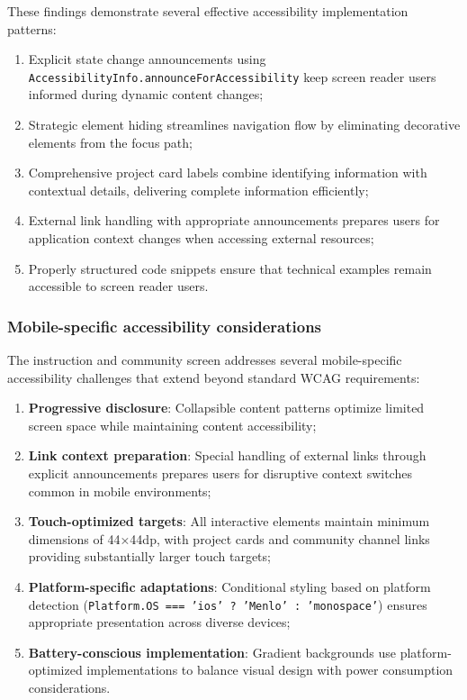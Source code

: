 These findings demonstrate several effective accessibility implementation patterns:
\begin{enumerate}
    \item Explicit state change announcements using \texttt{AccessibilityInfo.announceForAccessibility} keep screen reader users informed during dynamic content changes;
    
    \item Strategic element hiding streamlines navigation flow by eliminating decorative elements from the focus path;
    
    \item Comprehensive project card labels combine identifying information with contextual details, delivering complete information efficiently;
    
    \item External link handling with appropriate announcements prepares users for application context changes when accessing external resources;
    
    \item Properly structured code snippets ensure that technical examples remain accessible to screen reader users.
\end{enumerate}

\subsubsection{Mobile-specific accessibility considerations}
\label{subsubsec:instruction-mobile-specific-summary}

The instruction and community screen addresses several mobile-specific accessibility challenges that extend beyond standard WCAG requirements:

\begin{enumerate}
    \item \textbf{Progressive disclosure}: Collapsible content patterns optimize limited screen space while maintaining content accessibility;
    
    \item \textbf{Link context preparation}: Special handling of external links through explicit announcements prepares users for disruptive context switches common in mobile environments;
    
    \item \textbf{Touch-optimized targets}: All interactive elements maintain minimum dimensions of 44×44dp, with project cards and community channel links providing substantially larger touch targets;
    
    \item \textbf{Platform-specific adaptations}: Conditional styling based on platform detection (\texttt{Platform.OS === 'ios' ? 'Menlo' : 'monospace'}) ensures appropriate presentation across diverse devices;
    
    \item \textbf{Battery-conscious implementation}: Gradient backgrounds use platform-optimized implementations to balance visual design with power consumption considerations.
\end{enumerate}

